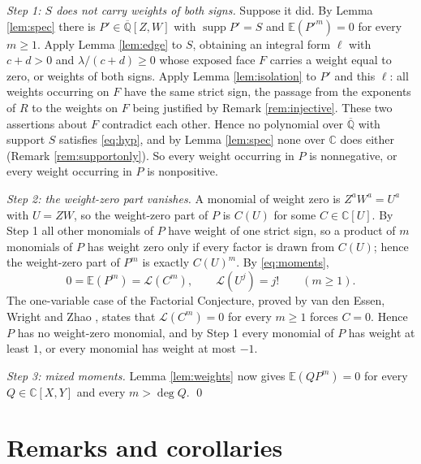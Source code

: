 \documentclass[10pt,a4paper]{amsart}
\numberwithin{equation}{section}
\DeclareMathOperator{\supp}{supp}
\newcommand{\C}{\mathbb{C}}
\newcommand{\Q}{\mathbb{Q}}
\newcommand{\E}{\mathbb{E}}
\newcommand{\Qbar}{\overline{\Q}}
\begin{document}
\smallskip
\noindent\emph{Step 1: $S$ does not carry weights of both signs.} Suppose it
did. By Lemma \ref{lem:spec} there is $P'\in\Qbar[Z,W]$ with $\supp P'=S$ and
$\E(P'^m)=0$ for every $m\ge1$. Apply Lemma \ref{lem:edge} to $S$, obtaining an
integral form $\ell$ with $c+d>0$ and $\lambda/(c+d)\ge0$ whose exposed face $F$
carries a weight equal to zero, or weights of both signs. Apply Lemma
\ref{lem:isolation} to $P'$ and this $\ell$: all weights occurring on $F$ have
the same strict sign, the passage from the exponents of $R$ to the weights on
$F$ being justified by Remark \ref{rem:injective}. These two assertions about
$F$ contradict each other. Hence no polynomial over $\Qbar$ with support $S$
satisfies \eqref{eq:hyp}, and by Lemma \ref{lem:spec} none over $\C$ does
either (Remark \ref{rem:supportonly}). So every weight occurring in $P$ is
nonnegative, or every weight occurring in $P$ is nonpositive.

\smallskip
\noindent\emph{Step 2: the weight-zero part vanishes.} A monomial of weight
zero is $Z^aW^a=U^a$ with $U=ZW$, so the weight-zero part of $P$ is $C(U)$ for
some $C\in\C[U]$. By Step 1 all other monomials of $P$ have weight of one strict
sign, so a product of $m$ monomials of $P$ has weight zero only if every factor
is drawn from $C(U)$; hence the weight-zero part of $P^m$ is exactly $C(U)^m$.
By \eqref{eq:moments},
\[
  0=\E(P^m)=\mathcal L(C^m),\qquad \mathcal L(U^j)=j! \qquad (m\ge1).
\]
The one-variable case of the Factorial Conjecture, proved by van den Essen,
Wright and Zhao \cite[Thm.~4.9]{vdEWZ}, states that $\mathcal L(C^m)=0$ for
every $m\ge1$ forces $C=0$. Hence $P$ has no weight-zero monomial, and by Step
1 every monomial of $P$ has weight at least $1$, or every monomial has weight at
most $-1$.

\smallskip
\noindent\emph{Step 3: mixed moments.} Lemma \ref{lem:weights} now gives
$\E(QP^m)=0$ for every $Q\in\C[X,Y]$ and every $m>\deg Q$. \qed

\section{Remarks and corollaries}\label{sec:remarks}
\end{document}
